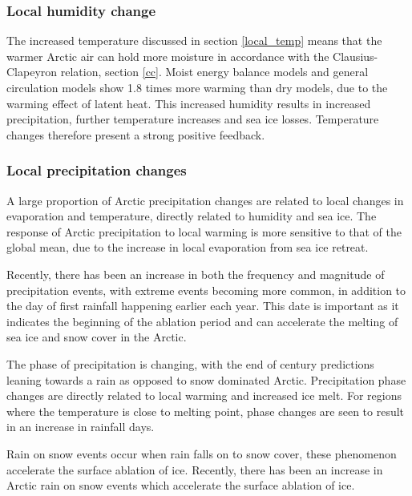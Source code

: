 \documentclass[12pt, oneside]{article}
\begin{document}


\subsubsection{Local humidity change}
The increased temperature discussed in section \ref{local_temp} means that the warmer Arctic air can hold more moisture in accordance with the Clausius-Clapeyron relation, section \ref{cc}. Moist energy balance models and general circulation models show 1.8 times more warming than dry models, due to the warming effect of latent heat\cite{feldl2021polar}. This increased humidity results in increased precipitation, further temperature increases and sea ice losses\cite{mccrystall2021new}. Temperature changes therefore present a strong positive feedback.


\subsubsection{Local precipitation changes}
A large proportion of Arctic precipitation changes are related to local changes in evaporation and temperature, directly related to humidity and sea ice. The response of Arctic precipitation to local warming is more sensitive to that of the global mean, due to the increase in local evaporation from sea ice retreat\cite{bintanja2014future}.


Recently, there has been an increase in both the frequency and magnitude of precipitation events, with extreme events becoming more common\cite{dou2022more}, in addition to the day of first rainfall happening earlier each year. This date is important as it indicates the beginning of the ablation period and can accelerate the melting of sea ice and snow cover in the Arctic.


The phase of precipitation is changing, with the end of century predictions leaning towards a rain as opposed to snow dominated Arctic. Precipitation phase changes are directly related to local warming and increased ice melt\cite{dou2022more}. For regions where the temperature is close to melting point, phase changes are seen to result in an increase in rainfall days.  

Rain on snow events occur when rain falls on to snow cover, these phenomenon 
accelerate the surface ablation of ice. Recently, there has been an increase in Arctic rain on snow events\cite{serreze2021arctic, dou2021trends} which accelerate the surface ablation of ice.
\end{document}
